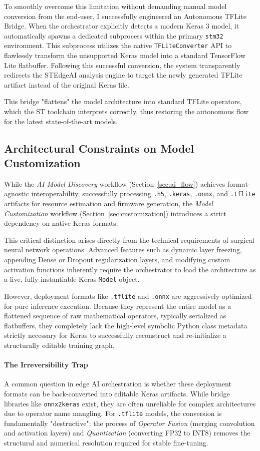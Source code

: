 To smoothly overcome this limitation without demanding manual model conversion from the end-user, I successfully engineered an Autonomous TFLite Bridge. When the orchestrator explicitly detects a modern Keras 3 model, it automatically spawns a dedicated subprocess within the primary \texttt{stm32} environment. This subprocess utilizes the native \texttt{TFLiteConverter} API to flawlessly transform the unsupported Keras model into a standard TensorFlow Lite flatbuffer. Following this successful conversion, the system transparently redirects the STEdgeAI analysis engine to target the newly generated TFLite artifact instead of the original Keras file.

This bridge "flattens" the model architecture into standard TFLite operators, which the ST toolchain interprets correctly, thus restoring the autonomous flow for the latest state-of-the-art models.

\subsection{Architectural Constraints on Model Customization}
While the \textit{AI Model Discovery} workflow (Section~\ref{sec:ai_flow}) achieves format-agnostic interoperability, successfully processing \texttt{.h5}, \texttt{.keras}, \texttt{.onnx}, and \texttt{.tflite} artifacts for resource estimation and firmware generation, the \textit{Model Customization} workflow (Section~\ref{sec:customization}) introduces a strict dependency on native Keras formats.

This critical distinction arises directly from the technical requirements of surgical neural network operations. Advanced features such as dynamic layer freezing, appending Dense or Dropout regularization layers, and modifying custom activation functions inherently require the orchestrator to load the architecture as a live, fully instantiable Keras \texttt{Model} object.

However, deployment formats like \texttt{.tflite} and \texttt{.onnx} are aggressively optimized for pure inference execution. Because they represent the entire model as a flattened sequence of raw mathematical operators, typically serialized as flatbuffers, they completely lack the high-level symbolic Python class metadata strictly necessary for Keras to successfully reconstruct and re-initialize a structurally editable training graph.

\paragraph{The Irreversibility Trap}
A common question in edge AI orchestration is whether these deployment formats can be back-converted into editable Keras artifacts. While bridge libraries like \texttt{onnx2keras} exist, they are often unreliable for complex architectures due to operator name mangling. For \texttt{.tflite} models, the conversion is fundamentally "destructive": the process of \textit{Operator Fusion} (merging convolution and activation layers) and \textit{Quantization} (converting FP32 to INT8) removes the structural and numerical resolution required for stable fine-tuning.

